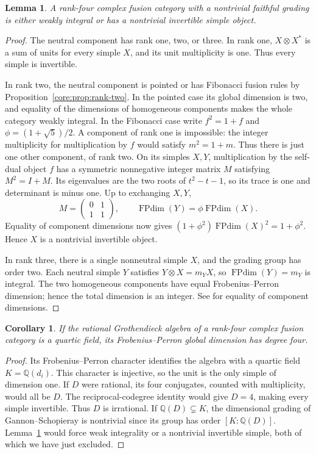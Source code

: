 \documentclass[11pt,a4paper]{article}
\newtheorem{lemma}[theorem]{Lemma}
\newtheorem{corollary}[theorem]{Corollary}
\theoremstyle{definition}\newtheorem{definition}[theorem]{Definition}
\theoremstyle{remark}\newtheorem{remark}[theorem]{Remark}
\newcommand{\Q}{\mathbb Q}
\numberwithin{equation}{section}
\begin{document}
\begin{lemma}\label{col:lem:rank-four-grading}
A rank-four complex fusion category with a nontrivial faithful
grading is either weakly integral or has a nontrivial invertible
simple object.
\end{lemma}
\begin{proof}
The neutral component has rank one, two, or three. In rank one,
$X\otimes X^*$ is a sum of units for every simple $X$, and its
unit multiplicity is one. Thus every simple is invertible.

In rank two, the neutral component is pointed or has Fibonacci
fusion rules by Proposition~\ref{core:prop:rank-two}. In the pointed case its global
dimension is two, and equality of the dimensions of homogeneous
components makes the whole category weakly integral. In the
Fibonacci case write $f^2=1+f$ and
$\phi=(1+\sqrt5)/2$. A component of rank one is impossible:
the integer multiplicity for multiplication by $f$ would satisfy
$m^2=1+m$. Thus there is just one other component, of rank two.
On its simples $X,Y$, multiplication by the self-dual object $f$
has a symmetric nonnegative integer matrix $M$ satisfying
$M^2=I+M$. Its eigenvalues are the two roots of $t^2-t-1$,
so its trace is one and determinant is minus one. Up to exchanging
$X,Y$,
\[
 M=\begin{pmatrix}0&1\\1&1\end{pmatrix},\qquad
 \operatorname{FPdim}(Y)=\phi\operatorname{FPdim}(X).
\]
Equality of component dimensions now gives
$(1+\phi^2)\operatorname{FPdim}(X)^2=1+\phi^2$.
Hence $X$ is a nontrivial invertible object.

In rank three, there is a single nonneutral simple $X$, and the
grading group has order two. Each neutral simple $Y$ satisfies
$Y\otimes X=m_YX$, so $\operatorname{FPdim}(Y)=m_Y$ is integral.
The two homogeneous components have equal Frobenius--Perron
dimension; hence the total dimension is an integer. See
\cite[Proposition~8.20]{ENO} for equality of component dimensions.
\end{proof}

\begin{corollary}\label{col:cor:quartic-order-casimir-degree}
If the rational Grothendieck algebra of a rank-four complex fusion
category is a quartic field, its Frobenius--Perron global dimension
has degree four.
\end{corollary}
\begin{proof}
Its Frobenius--Perron character identifies the algebra with a
quartic field $K=\Q(d_i)$. This character is injective, so the unit
is the only simple of dimension one. If $D$ were rational, its four
conjugates, counted with multiplicity, would all be $D$.
The reciprocal-codegree identity would give $D=4$, making every
simple invertible. Thus $D$ is irrational. If $\Q(D)\subsetneq K$,
the dimensional grading of Gannon--Schopieray
\cite[Section~1.2]{GannonSchopieray} is nontrivial since its group
has order $[K:\Q(D)]$. Lemma~\ref{col:lem:rank-four-grading}
would force weak integrality or a nontrivial invertible simple,
both of which we have just excluded.
\end{proof}
\end{document}
